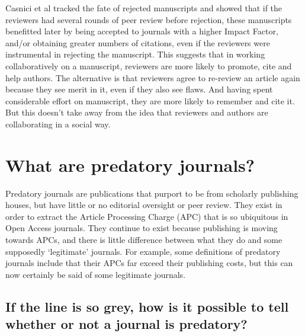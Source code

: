 \documentclass[
]{krantz}
\begin{document}
Casnici et al \citeyearpar{casnici2017assessing} tracked the fate of rejected manuscripts and showed that if the reviewers had several rounds of peer review before rejection, these manuscripts benefitted later by being accepted to journals with a higher Impact Factor, and/or obtaining greater numbers of citations, even if the reviewers were instrumental in rejecting the manuscript. This suggests that in working collaboratively on a manuscript, reviewers are more likely to promote, cite and help authors. The alternative is that reviewers agree to re-review an article again because they see merit in it, even if they also see flaws. And having spent considerable effort on manuscript, they are more likely to remember and cite it. But this doesn't take away from the idea that reviewers and authors are collaborating in a social way.

\hypertarget{predatory}{%
\chapter{What are predatory journals?}\label{predatory}}

Predatory journals are publications that purport to be from scholarly publishing houses, but have little or no editorial oversight or peer review. They exist in order to extract the Article Processing Charge (APC) that is so ubiquitous in Open Access journals. They continue to exist because publishing is moving towards APCs, and there is little difference between what they do and some supposedly `legitimate' journals. For example, some definitions of predatory journals include that their APCs far exceed their publishing costs, but this can now certainly be said of some legitimate journals.

\hypertarget{if-the-line-is-so-grey-how-is-it-possible-to-tell-whether-or-not-a-journal-is-predatory}{%
\section{If the line is so grey, how is it possible to tell whether or not a journal is predatory?}\label{if-the-line-is-so-grey-how-is-it-possible-to-tell-whether-or-not-a-journal-is-predatory}}
\end{document}
